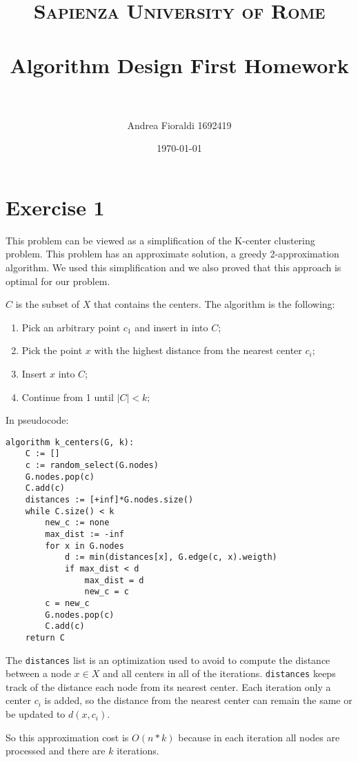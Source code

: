 \documentclass[paper=a4, fontsize=11pt]{scrartcl} %
\title{    
\normalfont \normalsize 
\textsc{Sapienza University of Rome} \\ [25pt] %
\horrule{0.5pt} \\[0.4cm] %
\huge Algorithm Design First Homework \\ %
\horrule{2pt} \\[0.5cm] %
}
\author{Andrea Fioraldi 1692419} %
\date{\normalsize\today} %
\numberwithin{equation}{section} %
\numberwithin{figure}{section} %
\numberwithin{table}{section} %
\begin{document}
\maketitle %

\section*{Exercise 1}

This problem can be viewed as a simplification of the K-center clustering problem. This problem has an approximate solution, a greedy 2-approximation algorithm. We used this simplification and we also proved that this approach is optimal for our problem.

$C$ is the subset of $X$ that contains the centers. The algorithm is the following:

\begin{enumerate}
    \item Pick an arbitrary point $c_1$ and insert in into $C$;
    \item Pick the point $x$ with the highest distance from the nearest center $c_i$;
    \item Insert $x$ into $C$;
    \item Continue from 1 until $|C| < k$;
\end{enumerate}

In pseudocode:

\begin{verbatim}
algorithm k_centers(G, k):
    C := []
    c := random_select(G.nodes)
    G.nodes.pop(c)
    C.add(c)
    distances := [+inf]*G.nodes.size()
    while C.size() < k
        new_c := none
        max_dist := -inf
        for x in G.nodes
            d := min(distances[x], G.edge(c, x).weigth)
            if max_dist < d
                max_dist = d
                new_c = c
        c = new_c
        G.nodes.pop(c)
        C.add(c)
    return C
\end{verbatim}

The \verb|distances| list is an optimization used to avoid to compute the distance between a node $x \in X$ and all centers in all of the iterations. \verb|distances| keeps track of the distance each node from its nearest center. Each iteration only a center $c_i$ is added, so the distance from the nearest center can remain the same or be updated to $d(x, c_i)$.

So this approximation cost is $O(n*k)$ because in each iteration all nodes are processed and there are $k$ iterations. 
\end{document}
